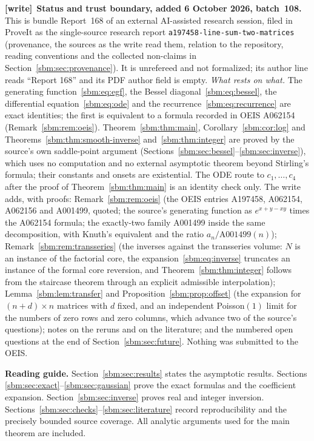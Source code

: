 \documentclass[11pt,letterpaper]{article}
\numberwithin{equation}{section}
\theoremstyle{remark}\newtheorem{remark}[theorem]{Remark}
\newcommand{\file}[1]{\nolinkurl{#1}}
\newenvironment{writenote}[1][]{\par\smallskip\begingroup\small
 \noindent\textbf{[write]}\if\relax\detokenize{#1}\relax\else~\textbf{#1.}\fi\ }%
 {\par\endgroup\smallskip}
\begin{document}
\begin{writenote}[Status and trust boundary, added 6 October 2026, batch~108]
This is bundle Report~168 of an external AI-assisted research session, filed
in ProveIt as the single-source research report
\file{a197458-line-sum-two-matrices} (provenance, the sources as the write
read them, relation to the repository, reading conventions and the collected
non-claims in Section~\ref{sbm:sec:provenance}). It is unrefereed and not
formalized; its author line reads ``Report 168'' and its PDF author field is
empty. \emph{What rests on what.} The generating function~\eqref{sbm:eq:egf},
the Bessel diagonal~\eqref{sbm:eq:bessel}, the differential
equation~\eqref{sbm:eq:ode} and the recurrence~\eqref{sbm:eq:recurrence} are
exact identities; the first is equivalent to a formula recorded in OEIS
A062154 (Remark~\ref{sbm:rem:oeis}). Theorem~\ref{sbm:thm:main},
Corollary~\ref{sbm:cor:log} and Theorems~\ref{sbm:thm:smooth-inverse}
and~\ref{sbm:thm:integer} are proved by the source's own saddle-point
argument (Sections~\ref{sbm:sec:bessel}--\ref{sbm:sec:inverse}), which uses
no computation and no external asymptotic theorem beyond Stirling's formula;
their constants and onsets are existential. The ODE route to
$c_1,\dots,c_4$ after the proof of Theorem~\ref{sbm:thm:main} is an identity
check only. The write adds, with proofs: Remark~\ref{sbm:rem:oeis} (the OEIS
entries A197458, A062154, A062156 and A001499, quoted; the source's
generating function as $e^{x+y-xy}$ times the A062154 formula; the
exactly-two family A001499 inside the same decomposition, with Knuth's
equivalent and the ratio $a_n/\mathrm{A001499}(n)$);
Remark~\ref{sbm:rem:transseries} (the inverses against the transseries
volume: $N$ is an instance of the factorial core, the
expansion~\eqref{sbm:eq:inverse} truncates an instance of the formal core
reversion, and Theorem~\ref{sbm:thm:integer} follows from the staircase
theorem through an explicit admissible interpolation);
Lemma~\ref{sbm:lem:transfer} and Proposition~\ref{sbm:prop:offset} (the
expansion for $(n+d)\times n$ matrices with $d$ fixed, and an independent
Poisson$(1)$ limit for the numbers of zero rows and zero columns, which
advance two of the source's questions); notes on the reruns and on the
literature; and the numbered open questions at the end of
Section~\ref{sbm:sec:future}. Nothing was submitted to the OEIS.
\end{writenote}
\newpage
\tableofcontents
\medskip
\noindent\textbf{Reading guide.}
Section~\ref{sbm:sec:results} states the asymptotic results. Sections
\ref{sbm:sec:exact}--\ref{sbm:sec:gaussian} prove the exact formulas and the
coefficient expansion. Section~\ref{sbm:sec:inverse} proves real and integer
inversion. Sections~\ref{sbm:sec:checks}--\ref{sbm:sec:literature} record
reproducibility and the precisely bounded source coverage. All analytic
arguments used for the main theorem are included.
\newpage
\end{document}
